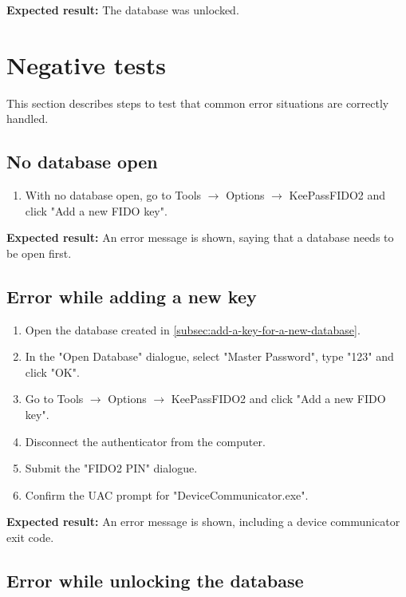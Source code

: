 \textbf{Expected result:}
The database was unlocked.

\section{Negative tests}\label{sec:negative-tests}

This section describes steps to test that common error situations are correctly handled.

\subsection{No database open}\label{subsec:no-database-open}

\begin{enumerate}
	\item With no database open, go to Tools $\rightarrow$ Options $\rightarrow$ KeePassFIDO2 and click "Add a new FIDO key".
\end{enumerate}

\textbf{Expected result:}
An error message is shown, saying that a database needs to be open first.

\subsection{Error while adding a new key}\label{subsec:error-while-adding-a-new-key}

\begin{enumerate}
	\item Open the database created in \autoref{subsec:add-a-key-for-a-new-database}.
	\item In the "Open Database" dialogue, select "Master Password", type "123" and click "OK".
	\item Go to Tools $\rightarrow$ Options $\rightarrow$ KeePassFIDO2 and click "Add a new FIDO key".
	\item Disconnect the authenticator from the computer.
	\item Submit the "FIDO2 PIN" dialogue.
	\item Confirm the UAC prompt for "DeviceCommunicator.exe".
\end{enumerate}

\textbf{Expected result:}
An error message is shown, including a device communicator exit code.


\subsection{Error while unlocking the database}\label{subsec:error-while-unlocking-the-database}

